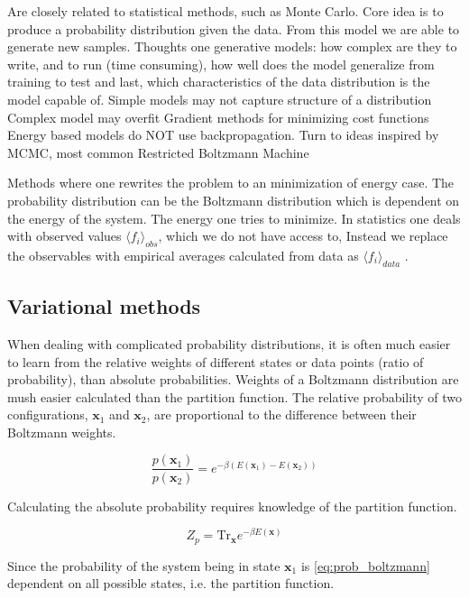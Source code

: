Are closely related to statistical methods, such as Monte Carlo.  \cite{mehta2019high}
Core idea is to produce a probability distribution given the data. From this model we are able to generate new samples. 
Thoughts one generative models: how complex are they to write, and to run (time consuming), how well does the model generalize from training to test and last, which characteristics of the data distribution is the model capable of.
Simple models may not capture structure of a distribution
Complex model may overfit 
Gradient methods for minimizing cost functions
Energy based models do NOT use backpropagation. 
Turn to ideas inspired by MCMC, most common Restricted Boltzmann Machine

Methods where one rewrites the problem to an minimization of energy case. The probability distribution can be the Boltzmann distribution which is dependent on the energy of the system. The energy one tries to minimize. In statistics one deals with observed values $\langle f_i \rangle_{obs}$, which we do not have access to, Instead we replace the observables with empirical averages calculated from data as $\langle f_i \rangle_{data}$ \cite{mehta2019high}.

\subsection{Variational methods}
\cite{mehta2019high}
When dealing with complicated probability distributions, it is often much easier to learn from the relative weights of different states or data points (ratio of probability), than absolute probabilities.  Weights of a Boltzmann distribution are mush easier calculated than the partition function. 
The relative probability of two configurations, $\mathbf{x}_1$ and $\mathbf{x}_2$, are proportional to the difference between their Boltzmann weights.

\begin{equation}
\frac{p(\mathbf{x}_1)}{p(\mathbf{x}_2)} = e^{-\beta (E(\mathbf{x}_1) - E(\mathbf{x}_2))}
\end{equation}

Calculating the absolute probability requires knowledge of the partition function.

\begin{equation}
Z_p = \text{Tr}_{\mathbf{x}} e^{-\beta E(\mathbf{x})}
\end{equation}

Since the probability of the system being in state $\mathbf{x}_1$ is \eqref{eq:prob_boltzmann} dependent on all possible states, i.e. the partition function. 

